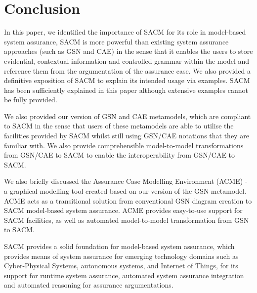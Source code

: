 \section{Conclusion}
\label{sec:conclusion}
In this paper, we identified the importance of SACM for its role in model-based system assurance, SACM is more powerful than existing system assurance approaches (such as GSN and CAE) in the sense that it enables the users to store evidential, contextual information and controlled grammar within the model and reference them from the argumentation of the assurance case. We also provided a definitive exposition of SACM to explain its intended usage via examples. SACM has been sufficiently explained in this paper although extensive examples cannot be fully provided.

We also provided our version of GSN and CAE metamodels, which are compliant to SACM in the sense that users of these metamodels are able to utilise the facilities provided by SACM whilst still using GSN/CAE notations that they are familiar with. 
We also provide comprehensible model-to-model transformations from GSN/CAE to SACM to enable the interoperability from GSN/CAE to SACM. 

We also briefly discussed the Assurance Case Modelling Environment (ACME) - a graphical modelling tool created based on our version of the GSN metamodel. ACME acts as a transitional solution from conventional GSN diagram creation to SACM model-based system assurance. ACME provides easy-to-use support for SACM facilities, as well as automated model-to-model transformation from GSN to SACM. 

SACM provides a solid foundation for model-based system assurance, which provides means of system assurance for emerging technology domains such as Cyber-Physical Systems, autonomous systems, and Internet of Things, for its support for runtime system assurance, automated system assurance integration and automated reasoning for assurance argumentations.\\


